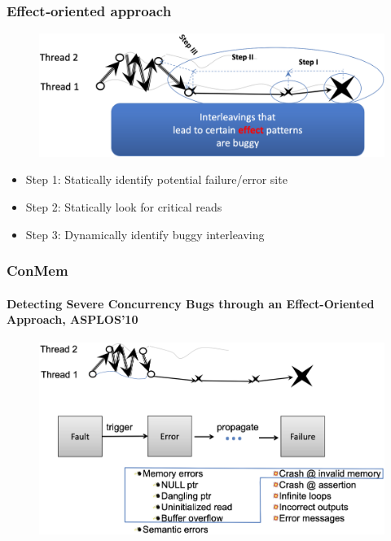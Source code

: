 % 
% 
% 
% 
\begin{frame}[fragile]
    \frametitle{Effect‐oriented approach}
    \begin{figure}
    \includegraphics[width=0.7\linewidth]{figs/Effect‐oriented-approach.png}
    \end{figure} \pause

    \begin{itemize}
        \item Step 1: Statically identify potential failure/error site \pause
        \item Step 2: Statically look for critical reads \pause
        \item Step 3: Dynamically identify buggy interleaving
    \end{itemize}

\end{frame}
% 
% 
% 
% 
% 
\begin{frame}[fragile]
    \frametitle{ConMem}
    \framesubtitle{Detecting Severe Concurrency Bugs through an Effect-Oriented Approach, ASPLOS’10}
    \begin{figure}
    \includegraphics[width=0.73\linewidth]{figs/ConMem.png}
    \end{figure}
\end{frame}
